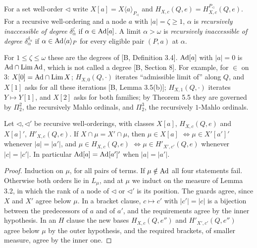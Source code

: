 \documentclass[11pt]{article}
\begin{document}
\begin{statement} For a set well-order $\lhd$ write $X[a] = X\langle a\rangle_{P_\lhd}$
and $H_{X,c}(Q,e) = H^{P_\lhd}_{X,c}(Q,e)$. For a recursive well-ordering and a node $a$ with $|a| = \zeta \ge 1$,
$\alpha$ is \emph{recursively inaccessible of degree $\delta_\alpha^\zeta$} if $\alpha \in \mathrm{Ad}[a]$. A limit $\alpha >
\omega$ is \emph{recursively inaccessible of degree $\delta_\alpha^{\delta_\alpha}$} if $\alpha \in \mathrm{Ad}\langle
a\rangle_P$ for every eligible pair $(P,a)$ at $\alpha$.
\end{statement}

For $1 \le \zeta \le \omega$ these are the degrees of [B, Definition 3.4]. $\mathrm{Ad}[a]$ with $|a| = 0$ is $\mathrm{Ad} \cap \mathrm{Lim}\, \mathrm{Ad}$,
which is not called a degree [B, Section 8]. For example, for $\in$ on $3$: $X[0] = \mathrm{Ad} \cap \mathrm{Lim}\, X$; $H_{X,0}(Q,\cdot)$
iterates ``admissible limit of'' along $Q$, and $X[1]$ asks for all these iterations [B, Lemma 3.5(b)]; $H_{X,1}(Q,\cdot)$
iterates $Y \mapsto Y[1]$, and $X[2]$ asks for both families; by Theorem 5.5 they are governed by $\Pi_2^2$, the recursively Mahlo ordinals, and $\Pi_2^3$, the
recursively $1$-Mahlo ordinals.

\begin{statement} Let $\lhd, \lhd'$ be recursive well-orderings,
with classes $X[a]$, $H_{X,c}(Q,e)$ and $X[a]'$, $H'_{X,c}(Q,e)$. If $X \cap \mu = X' \cap \mu$, then $\mu \in X[a]$
${}\iff \mu \in X'[a']'$ whenever $|a| = |a'|$, and $\mu \in H_{X,c}(Q,e)$ ${}\iff \mu \in H'_{X',c'}(Q,e)$ whenever
$|c| = |c'|$. In particular $\mathrm{Ad}[a] = \mathrm{Ad}[a']'$ when $|a| = |a'|$.
\end{statement}

\begin{proof}
Induction on $\mu$, for all pairs of terms. If $\mu \notin \mathrm{Ad}$ all four statements fail. Otherwise both orders lie in
$L_\mu$, and at $\mu$ we induct on the measure of Lemma 3.2, in which the rank of a node of $\lhd$ or $\lhd'$ is its
position. The guards agree, since $X$ and
$X'$ agree below $\mu$. In a bracket clause, $c \mapsto c'$ with $|c'| = |c|$ is a bijection between the predecessors
of $a$ and of $a'$, and the requirements agree by the inner hypothesis. In an $H$ clause the new bases
$H_{X,c}(Q,e'')$ and $H'_{X',c'}(Q,e'')$ agree below $\mu$ by the outer hypothesis, and the required brackets, of
smaller measure, agree by the inner one.
\end{proof}
\end{document}
